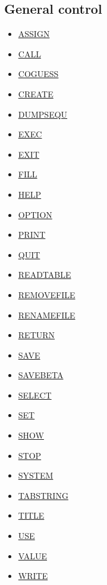 \subsection{General control}
\begin{itemize}
	\item \href{general.html#assign}{ASSIGN}
	\item \href{general.html#call}{CALL}
	\item \href{general.html#coguess}{COGUESS}
	\item \href{general.html#create}{CREATE}
	\item \href{general.html#dumpsequ}{DUMPSEQU}
	\item \href{general.html#exec}{EXEC}
	\item \href{general.html#exit}{EXIT}
	\item \href{general.html#fill}{FILL}
	\item \href{general.html#help}{HELP}
	\item \href{general.html#option}{OPTION}
	\item \href{general.html#print}{PRINT}
	\item \href{general.html#quit}{QUIT}
	\item \href{general.html#readtable}{READTABLE}
	\item \href{general.html#removefile}{REMOVEFILE}
	\item \href{general.html#renamefile}{RENAMEFILE}
	\item \href{general.html#return}{RETURN}
	\item \href{general.html#save}{SAVE}
	\item \href{general.html#savebeta}{SAVEBETA}
	\item \href{../Introduction/select.html}{SELECT}
	\item \href{../Introduction/set.html}{SET}
	\item \href{general.html#show}{SHOW}
	\item \href{general.html#stop}{STOP}
	\item \href{general.html#system}{SYSTEM}
	\item \href{general.html#tabstring}{TABSTRING}
	\item \href{general.html#title}{TITLE}
	\item \href{general.html#use}{USE}
	\item \href{general.html#value}{VALUE}
	\item \href{general.html#write}{WRITE}
\end{itemize}



